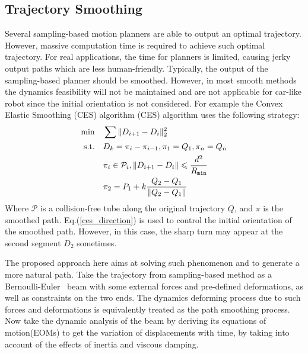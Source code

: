 \documentclass[conference, onecolumn]{IEEEtran}
\begin{document}

\subsection{Trajectory Smoothing}
Several sampling-based motion planners are able to output an optimal trajectory\cite{sst}\cite{anytimemotion}. However, massive computation time is required to achieve such optimal trajectory. For real applications, the time for planners is limited, causing jerky output paths which are less human-friendly. Typically, the output of the sampling-based planner should be smoothed. However, in most smooth methods the dynamics feasibility will not be maintained and are not applicable for car-like robot since the initial orientation is not considered. For example the Convex Elastic Smoothing (CES)\cite{zhu2015convex} algorithm (CES) algorithm uses the following strategy:
\begin{subequations}\label{ces}
	\begin{align}
		\min \quad & \sum \|D_{i+1}-D_{i}\|_2^2\\
		\textrm{s.t.} \quad & D_{k}=\pi_{i}-\pi_{i-1},\pi_1 = Q_1,\pi_n = Q_n\\
		\quad &  \pi_i \in \mathcal{P}_i ,\|D_{i+1}-D_{i}\| \leqslant \frac{d^2}{R_{\tt min}} \\
		\quad & \pi_2 = P_1 + k\frac{Q_2-Q_1}{\|Q_2-Q_1\|} \label{ces_direction}
	\end{align}
\end{subequations}
Where $\mathcal{P}$ is a collision-free tube along the original trajectory $Q$, and $\pi$ is the smoothed path.
Eq.(\ref{ces_direction}) is used to control the initial orientation of the smoothed path. However, in this case, the sharp turn may appear at the second segment $D_2$ sometimes. 

The proposed approach here aims at solving such phenomenon and to generate a more natural path. Take the trajectory from sampling-based method as a Bernoulli-Euler~\cite{Truesdell1984} beam with some external forces and pre-defined deformations, as well as constraints on the two ends. The dynamics deforming process due to such forces and deformations is equivalently treated as the path smoothing process. Now take the dynamic analysis of the beam by deriving its equations of motion(EOMs) to get the variation of displacements with time, by taking into account of the effects of inertia and viscous damping.
\end{document}
